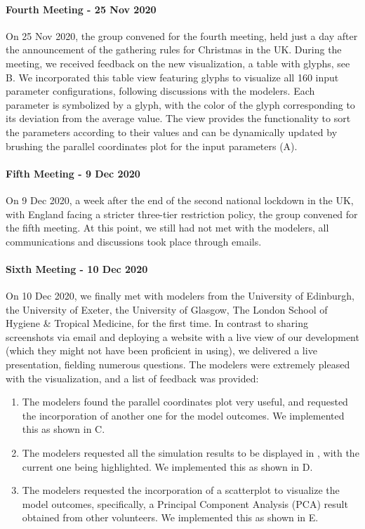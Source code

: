 \paragraph{Fourth Meeting - 25 Nov 2020}
On 25 Nov 2020, the group convened for the fourth meeting, held just a day after the announcement of the gathering rules for Christmas in the UK.
During the meeting, we received feedback on the new visualization, a table with glyphs, see B. We incorporated this table view featuring glyphs to visualize all 160 input parameter configurations, following discussions with the modelers.
Each parameter is symbolized by a glyph, with the color of the glyph corresponding to its deviation from the average value.
The view provides the functionality to sort the parameters according to their values and can be dynamically updated by brushing the parallel coordinates plot for the input parameters (A).

\paragraph{Fifth Meeting - 9 Dec 2020}
On 9 Dec 2020, a week after the end of the second national lockdown in the UK, with England facing a stricter three-tier restriction policy, the group convened for the fifth meeting.
At this point, we still had not met with the modelers, all communications and discussions took place through emails.

\paragraph{Sixth Meeting - 10 Dec 2020}
On 10 Dec 2020, we finally met with modelers from the University of Edinburgh, the University of Exeter, the University of Glasgow, The London School of Hygiene \& Tropical Medicine, for the first time.
In contrast to sharing screenshots via email and deploying a website with a live view of our development (which they might not have been proficient in using), we delivered a live presentation, fielding numerous questions.
The modelers were extremely pleased with the visualization, and a list of feedback was provided:
\begin{enumerate}
    \item The modelers found the parallel coordinates plot very useful, and requested the incorporation of another one for the model outcomes. We implemented this as shown in C.
    \item The modelers requested all the simulation results to be displayed in , with the current one being highlighted. We implemented this as shown in D.
    \item The modelers requested the incorporation of a scatterplot to visualize the model outcomes, specifically, a Principal Component Analysis (PCA) result obtained from other volunteers. We implemented this as shown in E.
\end{enumerate}

